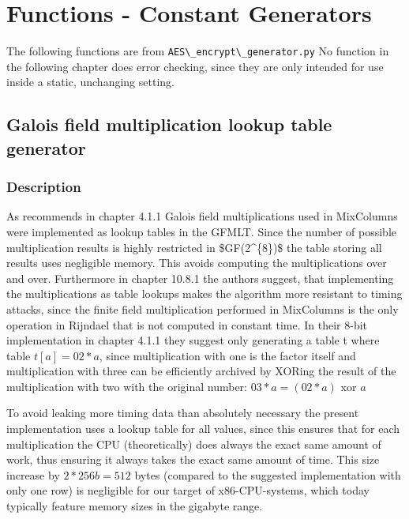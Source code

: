 \hypertarget{functions---constant-generators}{%
\chapter{Functions - Constant
Generators}\label{functions---constant-generators}}

The following functions are from \lstinline{AES\_encrypt\_generator.py} No
function in the following chapter does error checking, since they are
only intended for use inside a static, unchanging setting.

\hypertarget{galois-field-multiplication-lookup-table-generator}{%
\section{Galois field multiplication lookup table
generator}\label{galois-field-multiplication-lookup-table-generator}}

\hypertarget{description}{%
\subsection{Description}\label{description}}

As \cite{rijndael} recommends in chapter 4.1.1 Galois field multiplications
used in MixColumns were implemented as lookup tables in the \ac{GFMLT}. Since the
number of possible multiplication results is highly restricted in \ac{$GF(2^{8})$}
the table storing all results uses negligible memory. This avoids computing
the multiplications over and over. Furthermore in chapter 10.8.1 the
authors suggest, that implementing the multiplications as table lookups
makes the algorithm more resistant to timing attacks, since the finite
field multiplication performed in MixColumns is the only operation in
Rijndael that is not computed in constant time. In their 8-bit
implementation in chapter 4.1.1 they suggest only generating a table t
where table $t[a] = 02 * a$, since multiplication with one is the factor
itself and multiplication with three can be efficiently archived by
\ac{XOR}ing the result of the multiplication with two with the original
number: $03 * a = (02 * a)$ xor $a$

To avoid leaking more timing data than
absolutely necessary the present implementation uses a lookup table for
all values, since this ensures that for each multiplication the \ac{CPU}
(theoretically) does always the exact same amount of work, thus ensuring
it always takes the exact same amount of time. This size increase by $2 *
256b = 512$ bytes (compared to the suggested implementation with only one
row) is negligible for our target of \ac{x86}-\ac{CPU}-systems, which today
typically feature memory sizes in the gigabyte range.

